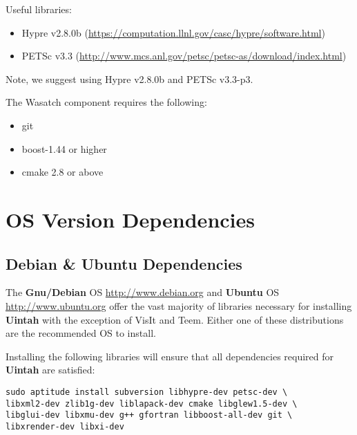 \documentclass[11pt,fleqn]{book} %
\begin{document}
Useful libraries:
\begin{itemize}
\item Hypre v2.8.0b (\url{https://computation.llnl.gov/casc/hypre/software.html})
\item PETSc v3.3 (\url{http://www.mcs.anl.gov/petsc/petsc-as/download/index.html})
\end{itemize}

Note, we suggest using Hypre v2.8.0b and PETSc v3.3-p3. 

The Wasatch component requires the following:
\begin{itemize}
  \item git
  \item boost-1.44 or higher
  \item cmake 2.8 or above
\end{itemize}
\chapter{OS Version Dependencies}

\section{Debian \& Ubuntu Dependencies}
\label{sec:debian_dependencies}
The \textbf{Gnu/Debian} OS \url{http://www.debian.org} and
\textbf{Ubuntu} OS \url{http://www.ubuntu.org} offer the vast majority
of libraries necessary for installing \textbf{Uintah} with the
exception of VisIt and Teem.  Either one of these distributions are
the recommended OS to install.

Installing the following libraries will ensure that all dependencies
required for \textbf{Uintah} are satisfied:

\begin{lstlisting} 
sudo aptitude install subversion libhypre-dev petsc-dev \ 
libxml2-dev zlib1g-dev liblapack-dev cmake libglew1.5-dev \
libglui-dev libxmu-dev g++ gfortran libboost-all-dev git \
libxrender-dev libxi-dev
\end{lstlisting}

  
\end{document}
